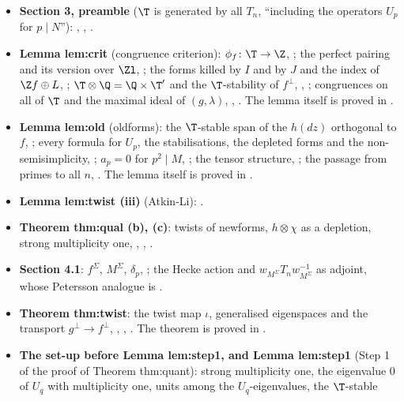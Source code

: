 \begin{itemize}
\item \textbf{Section 3, preamble} ($\T$ is generated by all $T_n$, ``including the operators $U_p$ for $p\mid N$''): ,
, .
\item \textbf{Lemma lem:crit} (congruence criterion): $\phi_f\colon\T\to\Z$, ; the perfect pairing and its version over $\Zl$,
; the forms killed by $I$ and by $J$ and the index of $\Z f\oplus L$, ; $\T\otimes\Q=\Q\times\T'$ and the
$\T$-stability of $f^\perp$, , ; congruences on all of $\T$ and the maximal ideal of $(g,\lambda)$,
, . The lemma itself is proved in .
\item \textbf{Lemma lem:old} (oldforms): the $\T$-stable span of the $h(dz)$ orthogonal to $f$, ; every formula for $U_p$, the stabilisations, the
depleted forms and the non-semisimplicity, ; $a_p=0$ for $p^2\mid M$, ; the tensor structure,
; the passage from primes to all $n$, . The lemma itself is proved in .
\item \textbf{Lemma lem:twist (iii)} (Atkin-Li): .
\item \textbf{Theorem thm:qual (b), (c)}: twists of newforms, $h\otimes\chi$ as a depletion, strong multiplicity one, ,
, .
\item \textbf{Section 4.1}: $f^\Sigma$, $M^\Sigma$, $\delta_p$, ; the Hecke action and $w_{M^\Sigma}T_nw_{M^\Sigma}^{-1}$ as adjoint, whose Petersson
analogue is .
\item \textbf{Theorem thm:twist}: the twist map $\iota$, generalised eigenspaces and the transport $g^\perp\to f^\perp$, ,
, . The theorem is proved in .
\item \textbf{The set-up before Lemma lem:step1, and Lemma lem:step1} (Step 1 of the proof of Theorem thm:quant): strong multiplicity one, the eigenvalue $0$ of $U_q$ with multiplicity one, units among the $U_q$-eigenvalues, the $\T$-stable

\end{itemize}
